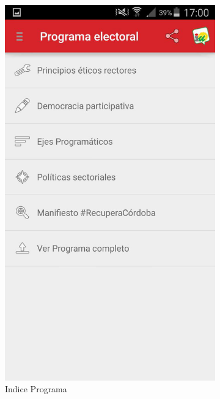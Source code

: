 \begin{figure}[H]
        \centering
        \begin{subfigure}[b]{0.3\textwidth}
                \includegraphics[width=\textwidth]{Media/Captures/IURecuperaCordoba.jpg}
                \caption{Indice Programa}
                \label{fig:iuIndex}
        \end{subfigure}
        ~
        \begin{subfigure}[b]{0.3\textwidth}

\end{subfigure}
\end{figure}
